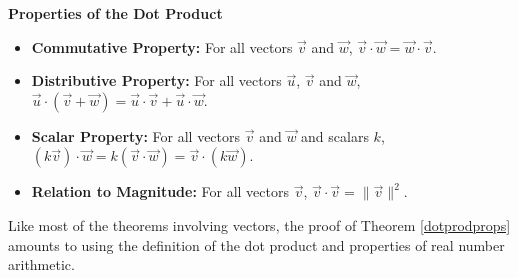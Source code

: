 \documentclass{ximera}
\begin{document}
\begin{theorem} \label{dotprodprops} \textbf{Properties of the Dot Product}   

\begin{itemize}

\item  \textbf{Commutative Property:}  For all vectors $\overrightarrow{v}$ and $\overrightarrow{w}$, $\overrightarrow{v} \cdot \overrightarrow{w} = \overrightarrow{w} \cdot \overrightarrow{v}$.   

\item  \textbf{Distributive Property:}  For all vectors $\overrightarrow{u}$, $\overrightarrow{v}$ and $\overrightarrow{w}$, $\overrightarrow{u} \cdot \left(\overrightarrow{v} + \overrightarrow{w}\right) = \overrightarrow{u} \cdot \overrightarrow{v} + \overrightarrow{u} \cdot \overrightarrow{w}$.   

\item  \textbf{Scalar Property:}  For all vectors $\overrightarrow{v}$ and $\overrightarrow{w}$ and scalars $k$, $ (k \overrightarrow{v}) \cdot \overrightarrow{w} = k(\overrightarrow{v} \cdot \overrightarrow{w}) = \overrightarrow{v} \cdot (k \overrightarrow{w})$.

\item  \textbf{Relation to Magnitude:}  For all vectors $\overrightarrow{v}$, $\overrightarrow{v} \cdot \overrightarrow{v} = \| \overrightarrow{v} \|^2$.   

\end{itemize}

 	

\end{theorem}


 

Like most of the theorems involving vectors, the proof of Theorem \ref{dotprodprops} amounts to using the definition of the dot product and properties of real number arithmetic. 
\end{document}
